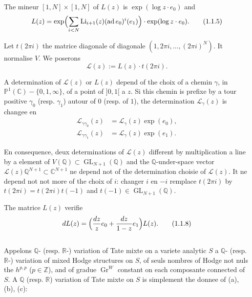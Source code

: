 \documentclass[12pt,a4paper]{article}
\theoremstyle{plain}
\theoremstyle{definition}
\theoremstyle{remark}
\DeclareMathOperator{\ad}{ad}
\newcommand{\Q}{\mathbb{Q}}
\newcommand{\R}{\mathbb{R}}
\newcommand{\C}{\mathbb{C}}
\newcommand{\Z}{\mathbb{Z}}
\newcommand{\IP}{\mathbb{P}}
\begin{document}
The mineur $[1,N]\times[1,N]$ of $L(z)$ is $\exp(\log z\cdot e_0)$ and
\begin{equation}\label{eq:1.1.5}
L(z) = \exp\Bigl(\sum_{i<N} \operatorname{Li}_{i+1}(z)(\ad e_0)^i(e_1)\Bigr)\cdot\exp(\log z\cdot e_0).
\tag{1.1.5}
\end{equation}

Let $t(2\pi i)$ the matrice diagonale of diagonale $(1,2\pi i,\ldots,(2\pi i)^N)$. It normalise $V$. We poserons
\begin{equation*}
\mathcal{L}(z) := L(z)\cdot t(2\pi i).
\end{equation*}

A d{e}termination of $\mathcal{L}(z)$ or $L(z)$ d{e}pend of the choix of a chemin $\gamma$, in $\IP^1(\C)-\{0,1,\infty\}$, of a point of $]0,1[$ {a} $z$. Si this chemin is pr{e}fix{e} by a tour positive $\gamma_0$ (resp. $\gamma_1$) autour of $0$ (resp. of $1$), the d{e}termination $\mathcal{L}_\gamma(z)$ is chang{e}e en
\begin{align}
\mathcal{L}_{\gamma\gamma_0}(z) &= \mathcal{L}_\gamma(z)\exp(e_0), \tag{1.1.6}\label{eq:1.1.6}\\
\mathcal{L}_{\gamma\gamma_1}(z) &= \mathcal{L}_\gamma(z)\exp(e_1). \tag{1.1.7}\label{eq:1.1.7}
\end{align}

En cons{e}quence, deux d{e}terminations of $\mathcal{L}(z)$ diff{e}rent by multiplication {a} line by a {e}l{e}ment of $V(\Q)\subset\operatorname{GL}_{N+1}(\Q)$ and the $\Q$-under-space vector $\mathcal{L}(z)\Q^{N+1}\subset\C^{N+1}$ ne d{e}pend not of the d{e}termination choisie of $\mathcal{L}(z)$. It ne d{e}pend not not more of the choix of $i$: changer $i$ en $-i$ remplace $t(2\pi i)$ by $t(2\pi i)=t(2\pi i)t(-1)$ and $t(-1)\in\operatorname{GL}_{N+1}(\Q)$.

The matrice $L(z)$ v{e}rifie
\begin{equation}\label{eq:1.1.8}
dL(z) = \Bigl(\frac{dz}{z}e_0 + \frac{dz}{1-z}e_1\Bigr)L(z).
\tag{1.1.8}
\end{equation}

\subsection{}

Appelons $\Q$- (resp. $\R$-) variation of Tate mixte on a vari{e}t{e} analytic $S$ a $\Q$- (resp. $\R$-) variation of mixed Hodge structures on $S$, of seuls nombres of Hodge not nuls the $h^{p,p}$ ($p\in\Z$), and of gradu{e} $\operatorname{Gr}^W$ constant on each composante connected of $S$. A $\Q$ (resp. $\R$) variation of Tate mixte on $S$ is simplement the donn{e}e of (a), (b), (c):
\end{document}

